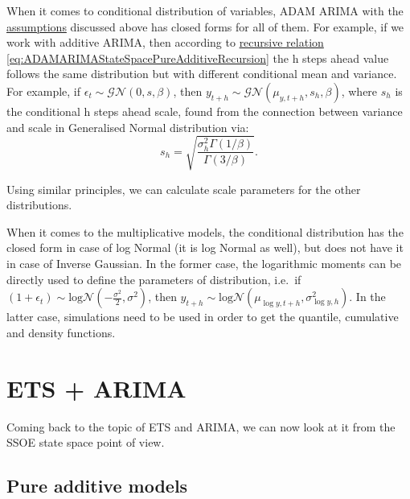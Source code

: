\documentclass[
]{book}
\theoremstyle{definition}
\theoremstyle{definition}
\theoremstyle{definition}
\theoremstyle{definition}
\theoremstyle{remark}
\begin{document}
When it comes to conditional distribution of variables, ADAM ARIMA with the \protect\hyperlink{ADAMARIMADistributions}{assumptions} discussed above has closed forms for all of them. For example, if we work with additive ARIMA, then according to \protect\hyperlink{ADAMARIMARecursive}{recursive relation} \eqref{eq:ADAMARIMAStateSpacePureAdditiveRecursion} the h steps ahead value follows the same distribution but with different conditional mean and variance. For example, if \(\epsilon_t \sim \mathcal{GN}(0, s, \beta)\), then \(y_{t+h} \sim \mathcal{GN}(\mu_{y,t+h}, s_{h}, \beta)\), where \(s_{h}\) is the conditional h steps ahead scale, found from the connection between variance and scale in Generalised Normal distribution via:
\begin{equation*}
    s_h = \sqrt{\frac{\sigma^2_h \Gamma(1/\beta)}{\Gamma(3/\beta)}}.
\end{equation*}

Using similar principles, we can calculate scale parameters for the other distributions.

When it comes to the multiplicative models, the conditional distribution has the closed form in case of log Normal (it is log Normal as well), but does not have it in case of Inverse Gaussian. In the former case, the logarithmic moments can be directly used to define the parameters of distribution, i.e.~if \(\left(1+\epsilon_t \right) \sim \text{log}\mathcal{N}\left(-\frac{\sigma^2}{2}, \sigma^2\right)\), then \(y_{t+h} \sim \text{log}\mathcal{N}\left(\mu_{\log y,t+h}, \sigma^2_{\log y,h} \right)\). In the latter case, simulations need to be used in order to get the quantile, cumulative and density functions.

\hypertarget{ETSAndARIMA}{%
\section{ETS + ARIMA}\label{ETSAndARIMA}}

Coming back to the topic of ETS and ARIMA, we can now look at it from the SSOE state space point of view.

\hypertarget{pure-additive-models}{%
\subsection{Pure additive models}\label{pure-additive-models}}
\end{document}

